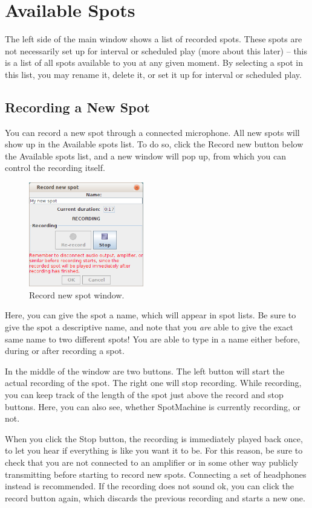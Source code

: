 \documentclass[a4paper,12pt]{report}
\begin{document}
\section{Available Spots}
The left side of the main window shows a list of recorded spots. These spots are
not necessarily set up for interval or scheduled play (more about this later) --
this is a list of all spots available to you at any given moment. By selecting a
spot in this list, you may rename it, delete it, or set it up for interval or
scheduled play.

\subsection{Recording a New Spot}
You can record a new spot through a connected microphone. All new spots will
show up in the Available spots list. To do so, click the Record new button below
the Available spots list, and a new window will pop up, from which you can
control the recording itself.

\begin{figure}[h]
\centering \includegraphics[width=50mm]{recorddialogue.png}
\caption{Record new spot window.}
\end{figure}

Here, you can give the spot a name, which will appear in spot lists. Be sure to
give the spot a descriptive name, and note that you {\em are} able to give the
exact same name to two different spots! You are able to type in a name either
before, during or after recording a spot.

In the middle of the window are two buttons. The left button will start the
actual recording of the spot. The right one will stop recording. While
recording, you can keep track of the length of the spot just above the record
and stop buttons. Here, you can also see, whether SpotMachine is currently
recording, or not.

When you click the Stop button, the recording is immediately played back once,
to let you hear if everything is like you want it to be. For this reason, be
sure to check that you are not connected to an amplifier or in some other way
publicly transmitting before starting to record new spots. Connecting a set of
headphones instead is recommended. If the recording does not sound ok, you can
click the record button again, which discards the previous recording and starts
a new one.
\end{document}
